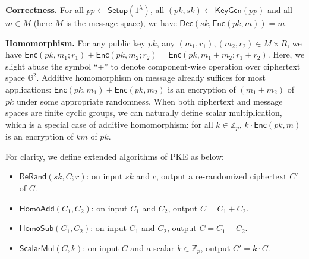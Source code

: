 \documentclass[a4paper,10pt]{article}
\begin{document}
\begin{trivlist}
\item \textbf{Correctness.} For all $pp \leftarrow \mathsf{Setup}(1^\lambda)$, 
    all $(pk, sk) \leftarrow \mathsf{KeyGen}(pp)$ and all $m \in M$ (here $M$ is the message space), 
    we have $\mathsf{Dec}(sk, \mathsf{Enc}(pk, m)) = m$.
\end{trivlist}

\begin{trivlist}
\item \textbf{Homomorphism.} For any public key $pk$, any $(m_1, r_1), (m_2, r_2) \in M \times R$, 
    we have $\mathsf{Enc}(pk, m_1; r_1) + \mathsf{Enc}(pk, m_2; r_2) = \mathsf{Enc}(pk, m_1+m_2; r_1+r_2)$. 
    Here, we slight abuse the symbol ``+'' to denote component-wise operation over ciphertext space $\mathbb{G}^2$. 
    Additive homomorphism on message already suffices for most applications: 
    $\mathsf{Enc}(pk, m_1) + \mathsf{Enc}(pk, m_2)$ is an encryption of $(m_1+m_2)$ of $pk$ under some appropriate randomness. 
    When both ciphertext and message spaces are finite cyclic groups, we can naturally define scalar multiplication, 
    which is a special case of additive homomorphism: 
    for all $k \in \mathbb{Z}_p$, $k \cdot \mathsf{Enc}(pk, m)$ is an encryption of $km$ of $pk$. 
\end{trivlist}

For clarity, we define extended algorithms of PKE as below: 
\begin{itemize} \itemsep 1pt \parskip 0pt \parsep 0pt
    \item $\mathsf{ReRand}(sk, C; r)$: on input $sk$ and $c$, output a re-randomized ciphertext $C'$ of $C$. 

    \item $\mathsf{HomoAdd}(C_1, C_2)$: on input $C_1$ and $C_2$, output $C = C_1 + C_2$.  

    \item $\mathsf{HomoSub}(C_1, C_2)$: on input $C_1$ and $C_2$, output $C = C_1 - C_2$. 

    \item $\mathsf{ScalarMul}(C, k)$: on input $C$ and a scalar $k \in \mathbb{Z}_p$, output $C' = k \cdot C$.  
\end{itemize}
\end{document}
